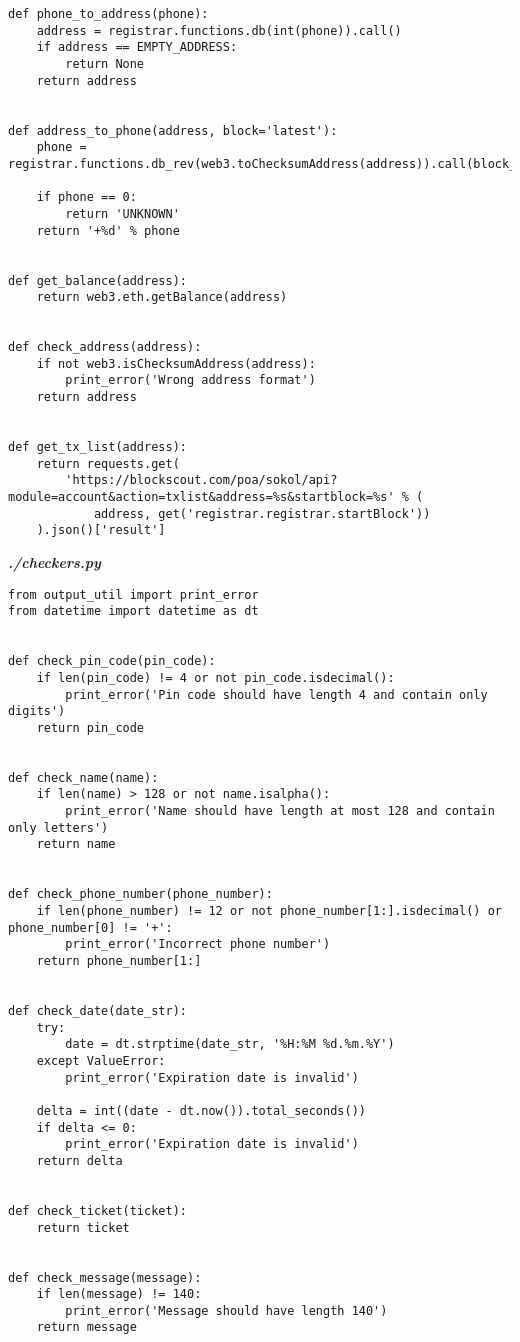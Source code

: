 \begin{verbatim}
def phone_to_address(phone):
    address = registrar.functions.db(int(phone)).call()
    if address == EMPTY_ADDRESS:
        return None
    return address


def address_to_phone(address, block='latest'):
    phone = registrar.functions.db_rev(web3.toChecksumAddress(address)).call(block_identifier=block)

    if phone == 0:
        return 'UNKNOWN'
    return '+%d' % phone


def get_balance(address):
    return web3.eth.getBalance(address)


def check_address(address):
    if not web3.isChecksumAddress(address):
        print_error('Wrong address format')
    return address


def get_tx_list(address):
    return requests.get(
        'https://blockscout.com/poa/sokol/api?module=account&action=txlist&address=%s&startblock=%s' % (
            address, get('registrar.registrar.startBlock'))
    ).json()['result']
\end{verbatim}

\textit{\textbf{./checkers.py}}
\begin{verbatim}
from output_util import print_error
from datetime import datetime as dt


def check_pin_code(pin_code):
    if len(pin_code) != 4 or not pin_code.isdecimal():
        print_error('Pin code should have length 4 and contain only digits')
    return pin_code


def check_name(name):
    if len(name) > 128 or not name.isalpha():
        print_error('Name should have length at most 128 and contain only letters')
    return name


def check_phone_number(phone_number):
    if len(phone_number) != 12 or not phone_number[1:].isdecimal() or phone_number[0] != '+':
        print_error('Incorrect phone number')
    return phone_number[1:]


def check_date(date_str):
    try:
        date = dt.strptime(date_str, '%H:%M %d.%m.%Y')
    except ValueError:
        print_error('Expiration date is invalid')

    delta = int((date - dt.now()).total_seconds())
    if delta <= 0:
        print_error('Expiration date is invalid')
    return delta


def check_ticket(ticket):
    return ticket


def check_message(message):
    if len(message) != 140:
        print_error('Message should have length 140')
    return message
\end{verbatim}

